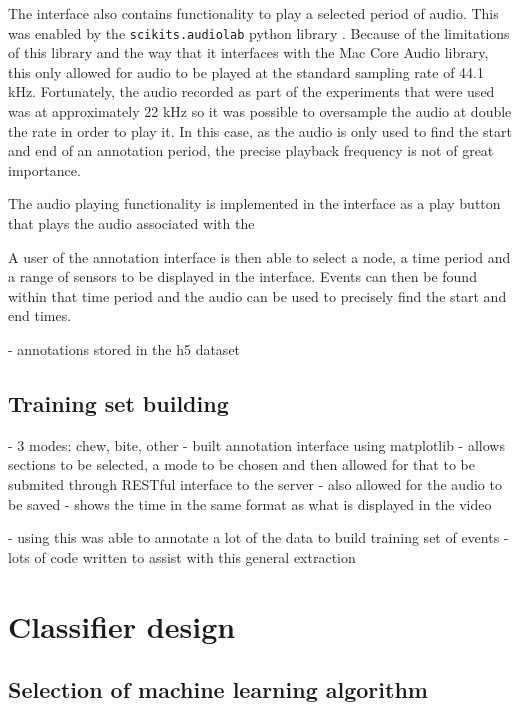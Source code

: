 The interface also contains functionality to play a selected period of audio. This was enabled by the \texttt{scikits.audiolab} python library . Because of the limitations of this library and the way that it interfaces with the Mac Core Audio library, this only allowed for audio to be played at the standard sampling rate of 44.1 kHz. Fortunately, the audio recorded as part of the experiments that were used was at approximately 22 kHz so it was possible to oversample the audio at double the rate in order to play it. In this case, as the audio is only used to find the start and end of an annotation period, the precise playback frequency is not of great importance. 

The audio playing functionality is implemented in the interface as a play button that plays the audio associated with the 

A user of the annotation interface is then able to select a node, a time period and a range of sensors to be displayed in the interface. Events can then be found within that time period and the audio can be used to precisely find the start and end times. 



- annotations stored in the h5 dataset


\subsection{Training set building}

- 3 modes: chew, bite, other
- built annotation interface using matplotlib
	- allows sections to be selected, a mode to be chosen and then allowed for that to be submited through RESTful interface to the server
- also allowed for the audio to be saved
- shows the time in the same format as what is displayed in the video

- using this was able to annotate a lot of the data to build training set of events
- lots of code written to assist with this general extraction

\section{Classifier design}

\subsection{Selection of machine learning algorithm}

